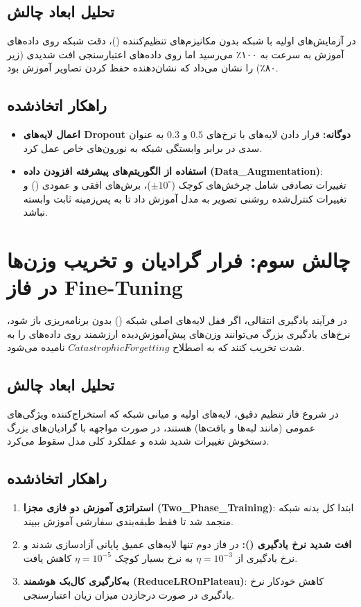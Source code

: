 \documentclass{report}
\begin{document}
 	\subsection{تحلیل ابعاد چالش}
 	در آزمایش‌های اولیه با شبکه  بدون مکانیزم‌های تنظیم‌کننده ()، دقت شبکه روی داده‌های آموزش به سرعت به ۱۰۰٪ می‌رسید اما روی داده‌های اعتبارسنجی افت شدیدی (زیر ۸۰٪) را نشان می‌داد که نشان‌دهنده حفظ کردن تصاویر آموزش بود.
 	
 	\subsection{راهکار اتخاذشده}
 	\begin{itemize}
 		\item \textbf{اعمال لایه‌های Dropout دوگانه:} قرار دادن لایه‌های  با نرخ‌های $0.5$ و $0.3$ به عنوان سدی در برابر وابستگی شبکه به نورون‌های خاص عمل کرد.
 		\item \textbf{استفاده از الگوریتم‌های پیشرفته افزودن داده (Data\_Augmentation)}: تغییرات تصادفی شامل چرخش‌های کوچک ($\pm 10^\circ$)، برش‌های افقی و عمودی () و تغییرات کنترل‌شده روشنی تصویر به مدل آموزش داد تا به پس‌زمینه ثابت وابسته نباشد.
 	\end{itemize}
 	
 	\section{چالش سوم: فرار گرادیان و تخریب وزن‌ها در فاز Fine-Tuning}
 	در فرآیند یادگیری انتقالی، اگر قفل لایه‌های اصلی شبکه () بدون برنامه‌ریزی باز شود، نرخ‌های یادگیری بزرگ می‌توانند وزن‌های پیش‌آموزش‌دیده ارزشمند روی داده‌های  را به شدت تخریب کنند که به اصطلاح $Catastrophic Forgetting$ نامیده می‌شود.
 	
 	\subsection{تحلیل ابعاد چالش}
 	در شروع فاز تنظیم دقیق، لایه‌های اولیه و میانی شبکه که استخراج‌کننده ویژگی‌های عمومی (مانند لبه‌ها و بافت‌ها) هستند، در صورت مواجهه با گرادیان‌های بزرگ دستخوش تغییرات شدید شده و عملکرد کلی مدل سقوط می‌کرد.
 	
 	\subsection{راهکار اتخاذشده}
 	\begin{enumerate}
 		\item \textbf{استراتژی آموزش دو فازی مجزا (Two\_Phase\_Training)}: ابتدا کل بدنه شبکه منجمد شد تا فقط  طبقه‌بندی سفارشی آموزش ببیند.
 		\item \textbf{افت شدید نرخ یادگیری ():} در فاز دوم تنها لایه‌های عمیق پایانی آزادسازی شدند و نرخ یادگیری از $\eta = 10^{-3}$ به نرخ بسیار کوچک $\eta = 10^{-5}$ کاهش یافت.
 		\item \textbf{به‌کارگیری کال‌بک هوشمند (ReduceLROnPlateau)}: کاهش خودکار نرخ یادگیری در صورت درجازدن میزان زیان اعتبارسنجی.
 	\end{enumerate}
 	
\end{document}
